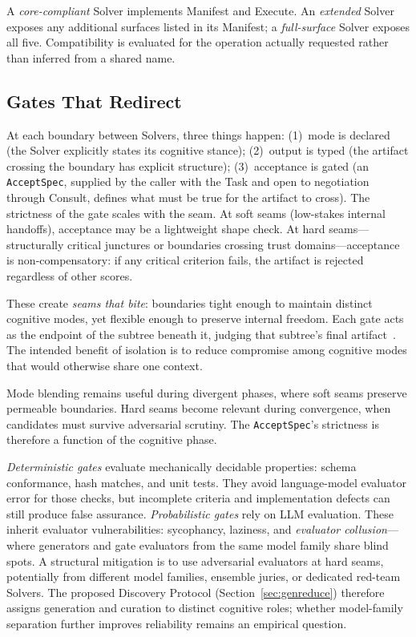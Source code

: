 \documentclass[11pt]{article}
\let\oldtexttt\texttt
\renewcommand{\texttt}[1]{\oldtexttt{\small #1}}
\begin{document}
\noindent A \emph{core-compliant} Solver implements Manifest and Execute. An \emph{extended} Solver exposes any additional surfaces listed in its Manifest; a \emph{full-surface} Solver exposes all five. Compatibility is evaluated for the operation actually requested rather than inferred from a shared name.

\subsection{Gates That Redirect}
\label{sec:seams}

At each boundary between Solvers, three things happen: (1)~mode is declared (the Solver explicitly states its cognitive stance); (2)~output is typed (the artifact crossing the boundary has explicit structure); (3)~acceptance is gated (an \texttt{AcceptSpec}, supplied by the caller with the Task and open to negotiation through Consult, defines what must be true for the artifact to cross). The strictness of the gate scales with the seam. At soft seams (low-stakes internal handoffs), acceptance may be a lightweight shape check. At hard seams---structurally critical junctures or boundaries crossing trust domains---acceptance is non-compensatory: if any critical criterion fails, the artifact is rejected regardless of other scores.

These create \emph{seams that bite}: boundaries tight enough to maintain distinct cognitive modes, yet flexible enough to preserve internal freedom. Each gate acts as the endpoint of the subtree beneath it, judging that subtree's final artifact~\cite{saltzer1984}. The intended benefit of isolation is to reduce compromise among cognitive modes that would otherwise share one context.

Mode blending remains useful during divergent phases, where soft seams preserve permeable boundaries. Hard seams become relevant during convergence, when candidates must survive adversarial scrutiny. The \texttt{AcceptSpec}'s strictness is therefore a function of the cognitive phase.

\emph{Deterministic gates} evaluate mechanically decidable properties: schema conformance, hash matches, and unit tests. They avoid language-model evaluator error for those checks, but incomplete criteria and implementation defects can still produce false assurance. \emph{Probabilistic gates} rely on LLM evaluation. These inherit evaluator vulnerabilities: sycophancy, laziness, and \emph{evaluator collusion}---where generators and gate evaluators from the same model family share blind spots. A structural mitigation is to use adversarial evaluators at hard seams, potentially from different model families, ensemble juries, or dedicated red-team Solvers. The proposed Discovery Protocol (Section~\ref{sec:genreduce}) therefore assigns generation and curation to distinct cognitive roles; whether model-family separation further improves reliability remains an empirical question.
\end{document}
